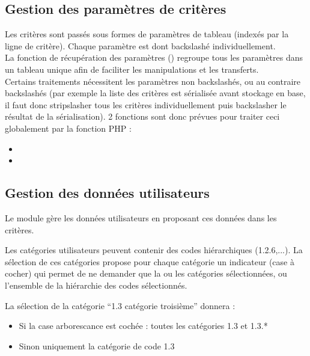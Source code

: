 \subsection{Gestion des paramètres de critères}

Les critères sont passés sous formes de paramètres de tableau (indexés par la ligne de critère).
Chaque paramètre est dont backslashé individuellement.\\

La fonction de récupération des paramètres () regroupe tous les paramètres dans un tableau unique  afin de faciliter les manipulations et les transferts.\\

Certains traitements nécessitent les paramètres non backslashés, ou au contraire backslashés (par exemple la liste des critères est sérialisée avant stockage en base, il faut donc stripslasher tous les critères individuellement puis backslasher le résultat de la sérialisation).
2 fonctions sont donc prévues pour traiter ceci globalement par la fonction PHP  :\\

\begin{itemize}
\item {}
\item {}
\end{itemize}


\subsection{Gestion des données utilisateurs}

Le module \List gère les données utilisateurs en proposant ces données dans les critères.

Les catégories utilisateurs peuvent contenir des codes hiérarchiques (1.2.6,...). La sélection de ces catégories propose pour chaque catégorie un indicateur (case à cocher) qui permet de ne demander que la ou les catégories sélectionnées, ou l'ensemble de la hiérarchie des codes sélectionnés.

La sélection de la catégorie ``1.3 catégorie troisième'' donnera :\\

\begin{itemize}
\item Si la case arborescance est cochée : toutes les catégories 1.3 et 1.3.*
\item Sinon uniquement la catégorie de code 1.3
\end{itemize}
\vspace{0.3cm}


